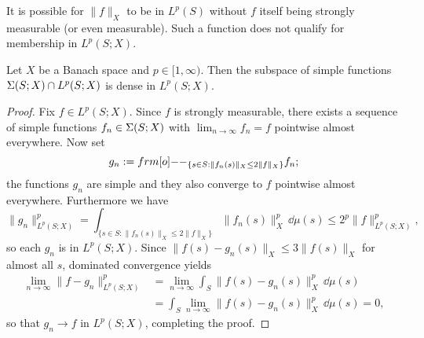 \begin{rmk}
  It is possible for $\|f\|_X$ to be in $L^p(S)$ without $f$ itself being strongly measurable (or even measurable).
  Such a function does not qualify for membership in $L^p(S;X)$.
\end{rmk}


\begin{prop}\label{prop:simple-density}
  Let $X$ be a Banach space and $p \in [1,\infty)$.
  Then the subspace of simple functions $\Sigma(S;X) \cap L^p(S;X)$ is dense in $L^p(S;X)$.
\end{prop}

\begin{proof}

  Fix $f \in L^p(S;X)$.
  Since $f$ is strongly measurable, there exists a sequence of simple functions $f_n \in \Sigma(S;X)$ with $\lim_{n \to \infty} f_n = f$ pointwise almost everywhere.
  Now set
  \begin{equation*}
    g_n := \1_{ \{s \in S : \|f_n(s)\|_X \leq 2\|f\|_X \} } f_n;
  \end{equation*}
  the functions $g_n$ are simple and they also converge to $f$ pointwise almost everywhere.
  Furthermore we have
  \begin{equation*}
    \|g_n\|_{L^p(S;X)}^p = \int_{\{s \in S : \|f_n(s)\|_X \leq 2\|f\|_X \} } \|f_n(s)\|_X^p \, \dd\mu(s) \leq 2^p \|f\|_{L^p(S;X)}^p,
  \end{equation*}
  so each $g_n$ is in $L^p(S;X)$.
  Since $\|f(s) - g_n(s)\|_X \leq 3\|f(s)\|_X$ for almost all $s$, dominated convergence yields
  \begin{equation*}
    \begin{aligned}
      \lim_{n \to \infty} \|f - g_n\|_{L^p(S;X)}^p &= \lim_{n \to \infty} \int_S \|f(s) - g_n(s)\|_{X}^p \, \dd\mu(s) \\
      &= \int_S \lim_{n \to \infty}  \|f(s) - g_n(s)\|_{X}^p \, \dd\mu(s) = 0,
    \end{aligned}
  \end{equation*}
  so that $g_n \to f$ in $L^p(S;X)$, completing the proof.
\end{proof}

